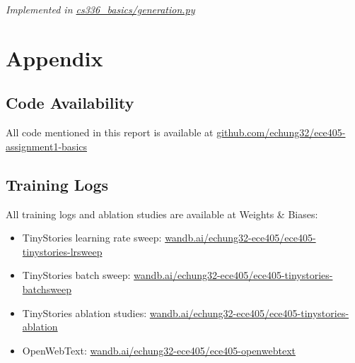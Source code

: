 \documentclass[letterpaper]{article}
\begin{document}
\textit{Implemented in  \href{https://github.com/echung32/ece405-assignment1-basics/blob/main/cs336_basics/generation.py}{cs336\_basics/generation.py}}

\appendix

\section{Appendix}

\subsection{Code Availability}

All code mentioned in this report is available at \href{https://github.com/echung32/ece405-assignment1-basics}{github.com/echung32/ece405-assignment1-basics}

\subsection{Training Logs}

All training logs and ablation studies are available at Weights \& Biases:

\begin{itemize}
	\item TinyStories learning rate sweep: \href{https://wandb.ai/echung32-ece405/ece405-tinystories-lrsweep}{wandb.ai/echung32-ece405/ece405-tinystories-lrsweep}
	\item TinyStories batch sweep: \href{https://wandb.ai/echung32-ece405/ece405-tinystories-batchsweep}{wandb.ai/echung32-ece405/ece405-tinystories-batchsweep}
	\item TinyStories ablation studies: \href{https://wandb.ai/echung32-ece405/ece405-tinystories-ablation}{wandb.ai/echung32-ece405/ece405-tinystories-ablation}
	\item OpenWebText: \href{https://wandb.ai/echung32-ece405/ece405-openwebtext}{wandb.ai/echung32-ece405/ece405-openwebtext}
\end{itemize}
\end{document}
